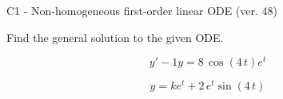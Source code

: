 \begin{exercise}
  \begin{exerciseTitle}C1 - Non-homogeneous first-order linear ODE (ver. 48)\end{exerciseTitle}
  \begin{exerciseStatement}
    
Find the general solution to the given ODE.

    
\[y'-1y= 8 \, \cos\left(4 \, t\right) e^{t}\]

  \end{exerciseStatement}
  \begin{exerciseAnswer}
    
\[y= k e^{t} + 2 \, e^{t} \sin\left(4 \, t\right)\]

  \end{exerciseAnswer}
\end{exercise}